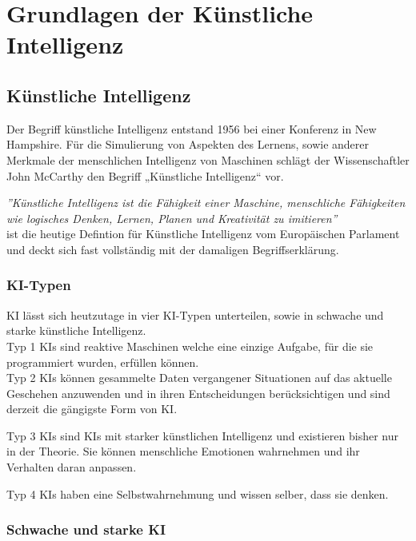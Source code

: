 \chapter{Grundlagen der Künstliche Intelligenz\label{cha:chapter2}}

\section{Künstliche Intelligenz\label{sec:bb}}

Der Begriff künstliche Intelligenz entstand 1956 bei einer 
Konferenz in New Hampshire. Für die Simulierung von Aspekten des 
Lernens, sowie anderer Merkmale der menschlichen Intelligenz von 
Maschinen schlägt der Wissenschaftler John McCarthy den Begriff 
„Künstliche Intelligenz“ vor. 
\cite{WasIstKuenstliche2021} \cite{WhatAIBasica}

\textit{''Künstliche Intelligenz ist die Fähigkeit einer Maschine, 
menschliche Fähigkeiten wie logisches Denken, Lernen, Planen und 
Kreativität zu imitieren''} \\ \cite{WasIstKuenstliche2020}
ist die heutige Defintion für Künstliche Intelligenz vom Europäischen Parlament 
und deckt sich fast vollständig mit der damaligen Begriffserklärung.

\subsection{KI-Typen}
KI lässt sich heutzutage in vier KI-Typen unterteilen, 
sowie in schwache und starke künstliche Intelligenz.
\\

Typ 1 KIs sind reaktive 
Maschinen welche eine einzige Aufgabe, für die sie programmiert wurden, 
erfüllen können.
\\

Typ 2 KIs können gesammelte Daten vergangener 
Situationen auf das aktuelle Geschehen anzuwenden und 
in ihren Entscheidungen berücksichtigen und sind derzeit die gängigste Form von KI.

Typ 3 KIs sind KIs mit starker künstlichen Intelligenz und 
existieren bisher nur in der Theorie. 
Sie können menschliche Emotionen wahrnehmen und ihr Verhalten daran anpassen.

Typ 4 KIs haben eine Selbstwahrnehmung und wissen selber, dass sie denken. 
\cite{stadlerKuenstlicheIntelligenz}

\subsection{Schwache und starke KI}

